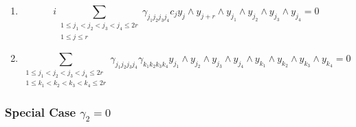 \documentclass[aps,preprint]{revtex4}%
\begin{document}
\begin{enumerate}
\item
\begin{equation}
i\sum_{\substack{1\leq j_{1}<j_{2}<j_{3}<j_{4}\leq2r\\1\leq j\leq r}%
}\gamma_{j_{1}j_{2}j_{3}j_{4}}c_{j}y_{j}\wedge y_{j+r}\wedge y_{j_{1}}\wedge
y_{j_{2}}\wedge y_{j_{3}}\wedge y_{j_{4}}=0
\end{equation}


\item
\begin{equation}
\sum_{\substack{1\leq j_{1}<j_{2}<j_{3}<j_{4}\leq2r\\1\leq k_{1}<k_{2}%
<k_{3}<k_{4}\leq2r}}\gamma_{j_{1}j_{2}j_{3}j_{4}}\gamma_{k_{1}k_{2}k_{3}k_{4}%
}y_{j_{1}}\wedge y_{j_{2}}\wedge y_{j_{3}}\wedge y_{j_{4}}\wedge y_{k_{1}%
}\wedge y_{k_{2}}\wedge y_{k_{3}}\wedge y_{k_{4}}=0
\end{equation}

\end{enumerate}

\subsubsection{Special Case $\gamma_{2}=0$}
\end{document}
